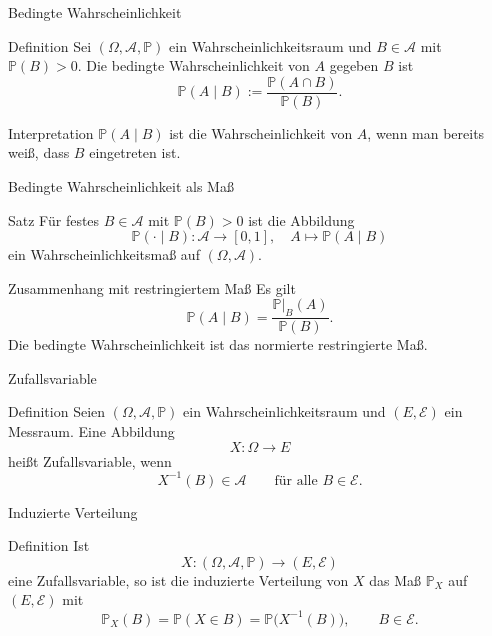 \documentclass{beamer}
\begin{document}
\begin{frame}{Bedingte Wahrscheinlichkeit}
\begin{block}{Definition}
Sei \((\Omega,\mathcal A,\mathbb P)\) ein Wahrscheinlichkeitsraum und \(B\in\mathcal A\) mit \(\mathbb P(B)>0\).
Die bedingte Wahrscheinlichkeit von \(A\) gegeben \(B\) ist
\[
\mathbb P(A\mid B):=\frac{\mathbb P(A\cap B)}{\mathbb P(B)}.
\]
\end{block}

\begin{block}{Interpretation}
\(\mathbb P(A\mid B)\) ist die Wahrscheinlichkeit von \(A\), wenn man bereits weiß, dass \(B\) eingetreten ist.
\end{block}
\end{frame}

\begin{frame}{Bedingte Wahrscheinlichkeit als Maß}
\begin{block}{Satz}
Für festes \(B\in\mathcal A\) mit \(\mathbb P(B)>0\) ist die Abbildung
\[
\mathbb P(\cdot\mid B)\colon \mathcal A\to[0,1],
\quad
A\mapsto \mathbb P(A\mid B)
\]
ein Wahrscheinlichkeitsmaß auf \((\Omega,\mathcal A)\).
\end{block}

\begin{block}{Zusammenhang mit restringiertem Maß}
Es gilt
\[
\mathbb P(A\mid B)=\frac{\mathbb P\vert_B(A)}{\mathbb P(B)}.
\]
Die bedingte Wahrscheinlichkeit ist das normierte restringierte Maß.
\end{block}
\end{frame}


\begin{frame}{Zufallsvariable}
\begin{block}{Definition}
Seien \((\Omega,\mathcal A,\mathbb P)\) ein Wahrscheinlichkeitsraum und \((E,\mathcal E)\) ein Messraum.
Eine Abbildung
\[
X\colon \Omega \to E
\]
hei\ss{}t Zufallsvariable, wenn
\[
X^{-1}(B)\in\mathcal A
\qquad
\text{für alle } B\in\mathcal E.
\]
\end{block}
\end{frame}

\begin{frame}{Induzierte Verteilung}
\begin{block}{Definition}
Ist
\[
X\colon (\Omega,\mathcal A,\mathbb P)\to(E,\mathcal E)
\]
eine Zufallsvariable, so ist die induzierte Verteilung von \(X\) das Maß \(\mathbb P_X\) auf \((E,\mathcal E)\) mit
\[
\mathbb P_X(B)=\mathbb P(X\in B)=\mathbb P\bigl(X^{-1}(B)\bigr),
\qquad B\in\mathcal E.
\]
\end{block}
\end{frame}
\end{document}

